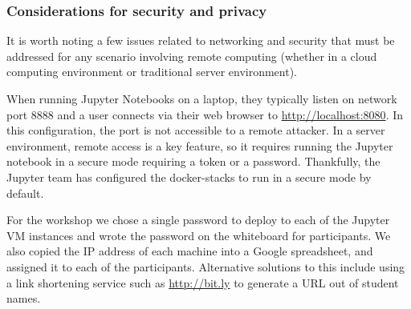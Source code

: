 \subsubsection{Considerations for security and privacy}

It is worth noting a few issues related to networking and security that must be
addressed for any scenario involving remote computing (whether in a cloud
computing environment or traditional server environment).

When running Jupyter Notebooks on a laptop, they typically listen on network
port 8888 and a user connects via their web browser to
\url{http://localhost:8080}. In this configuration, the port is not accessible
to a remote attacker. In a server environment, remote access is a key
feature, so it requires running the Jupyter notebook in a secure mode requiring
a token or a password. Thankfully, the Jupyter team has configured the
docker-stacks to run in a secure mode by default.

For the workshop we chose a single password to deploy to each of the Jupyter VM
instances and wrote the password on the whiteboard for participants. We also
copied the IP address of each machine into a Google spreadsheet, and assigned it
to each of the participants. Alternative solutions to this include using a link
shortening service such as \url{http://bit.ly} to generate a URL out of student
names.
